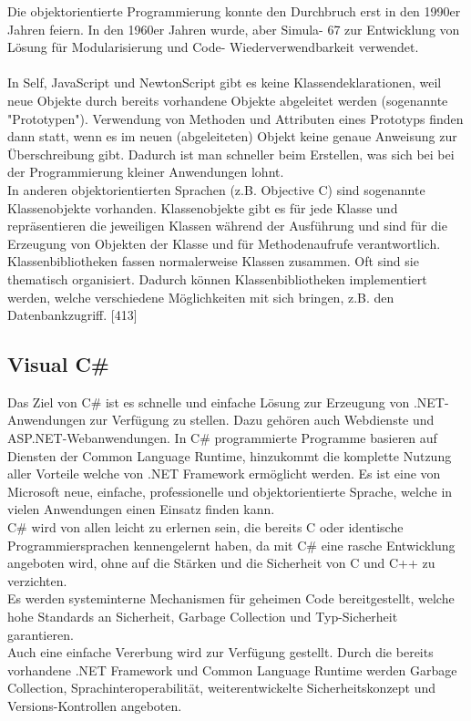 \documentclass[12pt,a4paper]{report}
\begin{document}
\begin{onehalfspace}
Die objektorientierte Programmierung konnte den Durchbruch erst in den 1990er Jahren feiern. In den 1960er Jahren wurde, aber Simula- 67 zur Entwicklung von Lösung für Modularisierung und Code- Wiederverwendbarkeit verwendet.\\
\\In Self, JavaScript und NewtonScript gibt es keine Klassendeklarationen, weil neue Objekte durch bereits vorhandene Objekte abgeleitet werden (sogenannte "{}Prototypen"{}). Verwendung von Methoden und Attributen eines Prototyps finden dann statt, wenn es im neuen (abgeleiteten) Objekt keine genaue Anweisung zur Überschreibung gibt. Dadurch ist man schneller beim Erstellen, was sich bei bei der Programmierung kleiner Anwendungen lohnt.\\

In anderen objektorientierten Sprachen (z.B. Objective C) sind sogenannte Klassenobjekte vorhanden. Klassenobjekte gibt es für jede Klasse und repräsentieren die jeweiligen Klassen während der Ausführung und sind für die Erzeugung von Objekten der Klasse und für Methodenaufrufe verantwortlich.\\

Klassenbibliotheken fassen normalerweise Klassen zusammen. Oft sind sie thematisch organisiert. Dadurch können Klassenbibliotheken implementiert werden, welche verschiedene Möglichkeiten mit sich bringen, z.B. den Datenbankzugriff. [413]

\subsection{Visual C\#} 
Das Ziel von C\# ist es schnelle und einfache Lösung zur Erzeugung von .NET-Anwendungen zur Verfügung zu stellen. Dazu gehören auch Webdienste und ASP.NET-Webanwendungen. In C\# programmierte Programme basieren auf Diensten der Common Language Runtime, hinzukommt die komplette Nutzung aller Vorteile welche von .NET Framework ermöglicht werden. Es ist eine von Microsoft neue, einfache, professionelle und objektorientierte Sprache, welche in vielen Anwendungen einen Einsatz finden kann.\\

C\# wird von allen leicht zu erlernen sein, die bereits C oder identische Programmiersprachen kennengelernt haben, da mit C\# eine rasche Entwicklung angeboten wird, ohne auf die Stärken und die Sicherheit von C und C++ zu verzichten.\\

Es werden systeminterne Mechanismen für geheimen Code bereitgestellt, welche hohe Standards an Sicherheit, Garbage Collection und Typ-Sicherheit garantieren.
\\Auch eine einfache Vererbung wird zur Verfügung gestellt. Durch die bereits vorhandene .NET Framework und Common Language Runtime werden Garbage Collection, Sprachinteroperabilität, weiterentwickelte Sicherheitskonzept und Versions-Kontrollen angeboten.


\end{onehalfspace}
\end{document}
